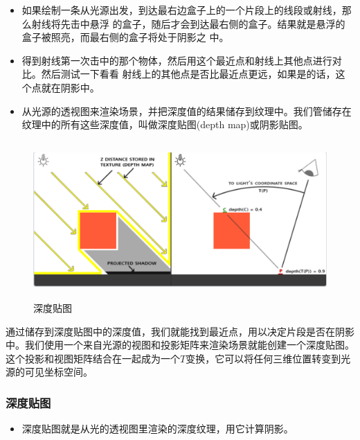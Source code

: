 \documentclass{article}
\begin{document}
  \begin{itemize}
	\item 如果绘制一条从光源出发，到达最右边盒子上的一个片段上的线段或射线，那么射线将先击中悬浮
	的盒子，随后才会到达最右侧的盒子。结果就是悬浮的盒子被照亮，而最右侧的盒子将处于阴影之
	中。
\end{itemize}

  \begin{itemize}
	\item 得到射线第一次击中的那个物体，然后用这个最近点和射线上其他点进行对比。然后测试一下看看
	射线上的其他点是否比最近点更远，如果是的话，这个点就在阴影中。
\end{itemize}

  \begin{itemize}
	\item 从光源的透视图来渲染场景，并把深度值的结果储存到纹理中。我们管储存在纹理中的所有这些深度值，叫做深度贴图(depth map)或阴影贴图。
\end{itemize}
	 \begin{figure}[H]
		\begin{center}
			\includegraphics[width=15cm,height=6cm]{depth map}
			\caption{深度贴图}	\label{shendu.label}
		\end{center}
	\end{figure}
通过储存到深度贴图中的深度值，我们就能找到最近点，用以决定片段是否在阴影中。我们使用一个来自光源的视图和投影矩阵来渲染场景就能创建一个深度贴图。这个投影和视图矩阵结合在一起成为一个$T$变换，它可以将任何三维位置转变到光源的可见坐标空间。

	\subsubsection{深度贴图}
	  \begin{itemize}
		\item 深度贴图就是从光的透视图里渲染的深度纹理，用它计算阴影。
	\end{itemize}
\end{document}
